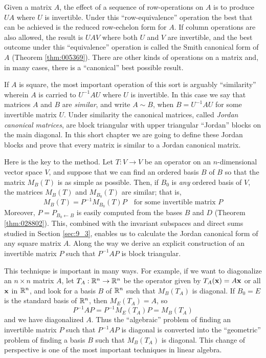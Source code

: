 \noindent Given a matrix $A$, the effect of a sequence of row-operations on $A$ is to produce $UA$ where $U$ is invertible. Under this ``row-equivalence'' operation the best that can be achieved is the reduced row-echelon form for $A$. If column operations are also allowed, the result is $UAV$ where both $U$ and $V$ are invertible, and the best outcome under this ``equivalence'' operation is called the Smith canonical form of $A$ (Theorem \ref{thm:005369}). There are other kinds of operations on a matrix and, in many cases, there is a ``canonical'' best possible result.

If $A$ is square, the most important operation of this sort is arguably ``similarity'' wherein $A$ is carried to $U^{-1}AU$ where $U$ is invertible. In this case we say that matrices $A$ and $B$ are \textit{similar}, and write $A \sim B$, when $B = U^{-1}AU$ for some invertible matrix $U$. Under similarity the canonical matrices, called \textit{Jordan canonical matrices}, are block triangular with upper triangular ``Jordan'' blocks on the main diagonal. In this short chapter we are going to define these Jordan blocks and prove that every matrix is similar to a Jordan canonical matrix.

Here is the key to the method. Let $T : V \to V$ be an operator on an $n$-dimensional vector space $V$, and suppose that we can find an ordered basis $B$ of $B$ so that the matrix $M_B(T)$ is as simple as possible. Then, if $B_0$ is \textit{any} ordered basis of $V$, the matrices $M_B(T)$ and $M_{B_0}(T)$ are similar; that is,
\begin{equation*}
M_B(T) = P^{-1} M_{B_0}(T)P \quad \mbox{for some invertible matrix } P
\end{equation*}
Moreover, $P=P_{B_0 \leftarrow B}$ is easily computed from the bases $B$ and $D$ (Theorem \ref{thm:028802}). This, combined with the invariant subspaces and direct sums studied in Section \ref{sec:9_3}, enables us to calculate the Jordan canonical form of any square matrix $A$. Along the way we derive an explicit construction of an invertible matrix $P$ such that $P^{-1}AP$ is block triangular. 

This technique is important in many ways. For example, if we want to diagonalize an $n \times n$ matrix $A$, let $T_A : \mathbb{R}^n \to \mathbb{R}^n$ be the operator given by $T_A(\textbf{x}) = A\textbf{x}$ or all $\textbf{x}$ in $\mathbb{R}^n$, and look for a basis $B$ of $\mathbb{R}^n$ such that $M_B(T_A)$ is diagonal. If $B_0 = E$ is the standard basis of $\mathbb{R}^n$, then $M_E(T_A)=A$, so 
\begin{equation*}
P^{-1}AP = P^{-1}M_E(T_A)P = M_B(T_A)
\end{equation*}
and we have diagonalized $A$. Thus the ``algebraic'' problem of finding an invertible matrix $P$ such that $P^{-1}AP$ is diagonal is converted into the ``geometric'' problem of finding a basis $B$ such that $M_B(T_A)$ is diagonal. This change of perspective is one of the most important techniques in linear algebra.
